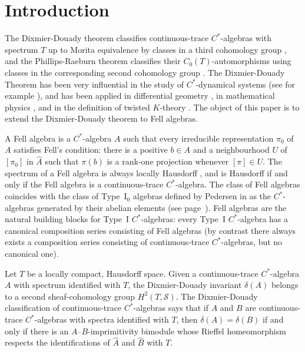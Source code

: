 \documentclass[12pt,a4paper]{amsart}
\newcommand{\Tgerms}{\mathcal{S}}
\begin{document}
\maketitle



\section{Introduction}

The Dixmier-Douady theorem classifies continuous-trace
$C^*$-algebras with spectrum $T$ up to Morita equivalence by
classes in a third cohomology group \cite{DD}, and the
Phillips-Raeburn theorem classifies their $C_0(T)$-automorphisms
using classes in the corresponding second cohomology group
\cite{PR}. The Dixmier-Douady Theorem has been very influential
in the study of $C^*$-dynamical systems (see for example
\cite{RW:dd}), and has been applied in differential geometry
\cite{Bry}, in mathematical physics \cite{BHM, CM, MR}, and in
the definition of twisted $K$-theory \cite{Ros}. The object of
this paper is to extend the Dixmier-Douady theorem to  Fell
algebras.

A Fell algebra is a $C^*$-algebra $A$ such that every
irreducible representation $\pi_0$ of $A$ satisfies Fell's
condition: there is a positive $b \in A$ and a neighbourhood
$U$ of $[\pi_0]$ in $\hat A$ such that $\pi(b)$ is a rank-one
projection whenever $[\pi] \in U$. The spectrum of a Fell
algebra is always locally Hausdorff \cite[Corollary~3.4]{AS},
and is Hausdorff if and only if the Fell algebra is  a
continuous-trace $C^*$-algebra. The class of  Fell algebras
coincides with the class of Type~I$_0$ algebras defined by
Pedersen in \cite[\S 6.1]{Ped} as the $C^*$-algebras generated
by their abelian elements (see page~\pageref{pg-fell}).
Fell algebras are the natural building blocks for Type~I
$C^*$-algebras: every Type~I $C^*$-algebra has a canonical
composition series consisting of Fell algebras
\cite[Theorem~6.2.6]{Ped} (by contrast there always exists a
composition series consisting of continuous-trace
$C^*$-algebras, but no canonical one).

Let $T$ be a locally compact, Hausdorff space. Given a
continuous-trace $C^*$-algebra $A$ with spectrum identified with
$T$, the Dixmier-Douady invariant $\delta(A)$ belongs to a
second sheaf-cohomology group $H^2(T,\Tgerms)$. The
Dixmier-Douady classification of continuous-trace $C^*$-algebras
says that if $A$ and $B$ are continuous-trace $C^*$-algebras
with spectra identified with $T$, then $\delta(A)=\delta(B)$ if
and only if there is an $A$--$B$-imprimitivity bimodule whose
Rieffel homeomorphism respects the identifications of
$\widehat{A}$ and $\widehat{B}$ with $T$.
\end{document}
